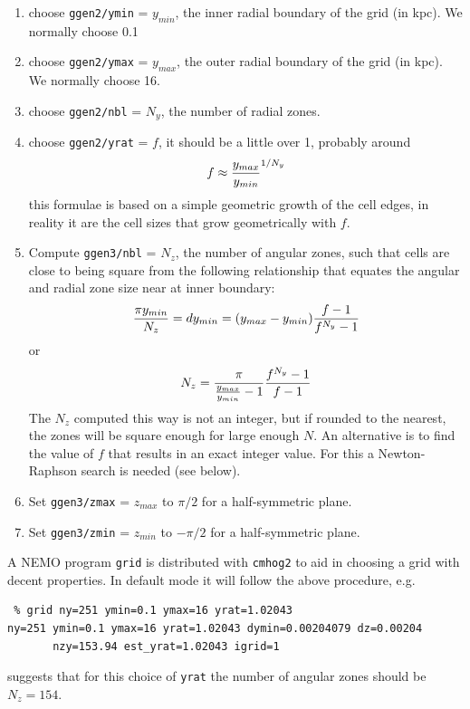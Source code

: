 \documentclass[10pt,dvips]{article}
\begin{document}
\begin{enumerate}
\item
choose  {\tt ggen2/ymin} = $y_{min}$, the inner radial 
boundary of the grid (in kpc). We normally choose 0.1

\item
choose {\tt ggen2/ymax} = $y_{max}$, the outer radial 
boundary of the grid (in kpc). We normally choose 16.

\item
choose {\tt ggen2/nbl} = $N_y$, the number of radial zones.

\item
choose {\tt ggen2/yrat} = $f$, it should be a little over 1,
probably around
$$
	 f \approx {y_{max} \over y_{min}}^{1/{N_y}}
$$
this formulae is based on a simple geometric growth of the cell edges, in reality
it are the cell sizes that grow geometrically with $f$.

\item
Compute {\tt ggen3/nbl} = $N_z$, the number of angular zones, such that cells are 
close to being square from the following relationship that equates the angular
and radial zone size near at inner boundary:
$$
   {{\pi y_{min}} \over N_z} = dy_{min} = (y_{max}-y_{min}) { {f-1} \over {f^{N_y}-1} }
$$
or
$$
N_z =   {  {\pi}   \over  { {y_{max} \over y_{min}}  - 1 } }  { {f^{N_y}-1} \over {f-1} }
$$
The $N_z$ computed this way is not an integer, but if rounded to the nearest, the zones will be
square enough for large enough $N$.
An alternative is to find the value of $f$ that results in an exact integer
value. For this a Newton-Raphson search is needed (see below). 
\item
Set {\tt ggen3/zmax} = $z_{max}$  to $\pi/2$ for a half-symmetric plane.

\item
Set {\tt ggen3/zmin} = $z_{min}$ to $-\pi/2$ for a half-symmetric plane.


\end{enumerate}

A NEMO program {\tt grid} is distributed with {\tt cmhog2} to aid
in choosing a grid with decent properties. In default mode it will follow the above procedure, e.g.

\begin{verbatim}
 % grid ny=251 ymin=0.1 ymax=16 yrat=1.02043
ny=251 ymin=0.1 ymax=16 yrat=1.02043 dymin=0.00204079 dz=0.00204 
       nzy=153.94 est_yrat=1.02043 igrid=1

\end{verbatim}
suggests that for this choice of {\tt yrat} the number of angular zones should be
$N_z=154$.
\end{document}
